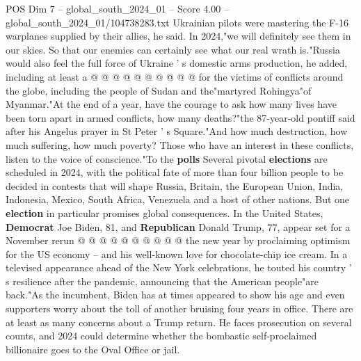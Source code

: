\begin{textsample}{POS Dim 7 – global\_south\_2024\_01 – Score 4.00 – global\_south\_2024\_01/104738283.txt}
Ukrainian pilots were mastering the F-16 warplanes supplied by their allies, he said.
In 2024,"we will definitely see them in our skies.
So that our enemies can certainly see what our real wrath is."Russia would also feel the full force of Ukraine ' s domestic arms production, he added, including at least a @ @ @ @ @ @ @ @ @ @ for the victims of conflicts around the globe, including the people of Sudan and the"martyred Rohingya"of Myanmar."At the end of a year, have the courage to ask how many lives have been torn apart in armed conflicts, how many deaths?"the 87-year-old pontiff said after his Angelus prayer in St Peter ' s Square."And how much destruction, how much suffering, how much poverty?
Those who have an interest in these conflicts, listen to the voice of conscience."To the \textbf{polls} Several pivotal \textbf{elections} are scheduled in 2024, with the political fate of more than four billion people to be decided in contests that will shape Russia, Britain, the European Union, India, Indonesia, Mexico, South Africa, Venezuela and a host of other nations.
But one \textbf{election} in particular promises global consequences.
In the United States, \textbf{Democrat} Joe Biden, 81, and \textbf{Republican} Donald Trump, 77, appear set for a November rerun @ @ @ @ @ @ @ @ @ @ the new year by proclaiming optimism for the US economy -- and his well-known love for chocolate-chip ice cream.
In a televised appearance ahead of the New York celebrations, he touted his country ' s resilience after the pandemic, announcing that the American people"are back."As the incumbent, Biden has at times appeared to show his age and even supporters worry about the toll of another bruising four years in office.
There are at least as many concerns about a Trump return.
He faces prosecution on several counts, and 2024 could determine whether the bombastic self-proclaimed billionaire goes to the Oval Office or jail.

\end{textsample}

